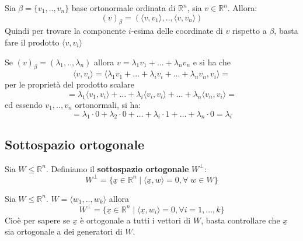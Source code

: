 \documentclass[
  a4paper,
]{article}
\begin{document}
\begin{propositionbox}
Sia \(\beta = \{v_1 , .., v_n\}\) base ortonormale ordinata di
\(\mathbb{R}^n\), sia \(v \in \mathbb{R}^n\). Allora: \[
(v)_{\beta} = (\langle v, v_1 \rangle, .., \langle v, v_n \rangle)
\] Quindi per trovare la componente \(i\)-esima delle coordinate di
\(v\) rispetto a \(\beta\), basta fare il prodotto
\(\langle v, v_i \rangle\)
\end{propositionbox}

\begin{proofbox}
Se \((v)_{\beta} = (\lambda_1, .., \lambda_n)\) allora
\(v = \lambda_1 v_1 + ... + \lambda_n v_n\) e si ha che \[
\langle v, v_i \rangle = \langle \lambda_1 v_1 + ...  + \lambda_i v_i + ... + \lambda_n v_n , v_i\rangle = 
\] per le proprietà del prodotto scalare \[
= \lambda_1 \langle v_1, v_i \rangle + \dots +\lambda_i \langle v_i, v_i \rangle + \dots + \lambda_n \langle v_n, v_i \rangle =
\] ed essendo \(v_1 , .., v_n\) ortonormali, si ha: \[
= \lambda_1 \cdot 0  +  \lambda_2 \cdot 0  + \dots +\lambda_i \cdot 1 + \dots + \lambda_n \cdot 0   = \lambda_i
\]
\end{proofbox}

\hypertarget{sottospazio-ortogonale}{%
\subsection{Sottospazio ortogonale}\label{sottospazio-ortogonale}}

\begin{definitionbox}
Sia \(W \leq \mathbb{R}^n\). Definiamo il \textbf{sottospazio
ortogonale} \(W^{\perp}\): \[
W^{\perp} = \{ \underline{x} \in \mathbb{R}^n \mid \langle \underline{x}, w \rangle = 0, \forall \;w \in W\}
\]
\end{definitionbox}

\begin{propositionbox}
Sia \(W \leq \mathbb{R}^n\). \(W = \langle w_1, .., w_k\rangle\) allora
\[
W^{\perp} = \{ \underline{x} \in \mathbb{R}^n \mid \langle \underline{x}, w_i \rangle = 0, \forall i = 1,\dots,k\}
\] Cioè per sapere se \(\underline{x}\) è ortogonale a tutti i vettori
di \(W\), basta controllare che \(\underline{x}\) sia ortogonale a dei
generatori di \(W\).
\end{propositionbox}
\end{document}
